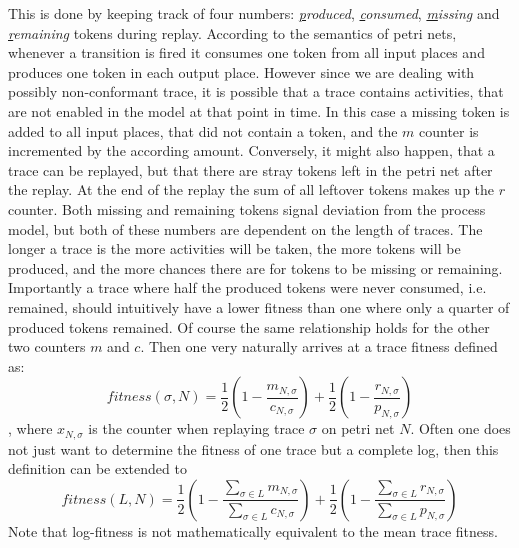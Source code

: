 \documentclass[runningheads]{template/llncs}
\begin{document}
This is done by keeping track of four numbers: \emph{\underline{p}roduced}, \emph{\underline{c}onsumed}, \emph{\underline{m}issing} and \emph{\underline{r}emaining} tokens during replay.
According to the semantics of petri nets, whenever a transition is fired it consumes one token from all input places and produces one token in each output place.
However since we are dealing with possibly non-conformant trace, it is possible that a trace contains activities, that are not enabled in the model at that point in time.
In this case a missing token is added to all input places, that did not contain a token, and the $m$ counter is incremented by the according amount.
Conversely, it might also happen, that a trace can be replayed, but that there are stray tokens left in the petri net after the replay. 
At the end of the replay the sum of all leftover tokens makes up the $r$ counter. 
Both missing and remaining tokens signal deviation from the process model, but both of these numbers are dependent on the length of traces.
The longer a trace is the more activities will be taken, the more tokens will be produced, and the more chances there are for tokens to be missing or remaining.
Importantly a trace where half the produced tokens were never consumed, i.e. remained, should intuitively have a lower fitness than one where only a quarter of produced tokens remained.
Of course the same relationship holds for the other two counters $m$ and $c$.
Then one very naturally arrives at a trace fitness defined as:
\begin{equation}
fitness(σ,N) = \frac{1}{2}(1-\frac{m_{N,σ}}{c_{N,σ}})+\frac{1}{2}(1-\frac{r_{N,σ}}{p_{N,σ}})
\end{equation}
, where $x_{N,σ}$ is the counter when replaying trace $σ$ on petri net $N$.
Often one does not just want to determine the fitness of one trace but a complete log, then this definition can be extended to 
\begin{equation}
	fitness(L,N) = \frac{1}{2}(1-\frac{\sum_{σ\in L}m_{N,σ}}{\sum_{σ\in L}c_{N,σ}})+\frac{1}{2}(1-\frac{\sum_{σ\in L}r_{N,σ}}{\sum_{σ\in L}p_{N,σ}})
\end{equation}
Note that log-fitness is not mathematically equivalent to the mean trace fitness.
\end{document}
